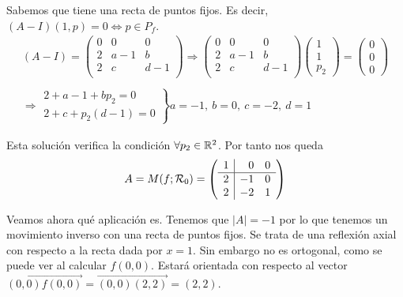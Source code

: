 \documentclass[12pt]{article}
\begin{document}
\begin{ejercicio}[3 puntos]
        Sabemos que tiene una recta de puntos fijos. Es decir, $(A-I)(1,p)=0 \Leftrightarrow p\in P_f$.
        \begin{gather*}
            (A-I)=\left(
                \begin{array}{c|cc}
                    0 & 0 & 0 \\
                    \hline
                    2 & a-1 & b \\
                    2 & c & d-1 \\
                \end{array}\right) \Rightarrow 
                \left(
                \begin{array}{c|cc}
                    0 & 0 & 0 \\
                    \hline
                    2 & a-1 & b \\
                    2 & c & d-1 \\
                \end{array}\right)
                \begin{pmatrix}
                    1\\1\\p_2
                \end{pmatrix} = 
                \begin{pmatrix}
                    0\\0\\0
                \end{pmatrix}\\\\
                \Rightarrow \left.
                \begin{array}{c}
                    2 + a -1 +bp_2 =0\\
                    2+c+p_2(d-1)=0
                \end{array} \right\} a=-1,\ b=0,\ c=-2,\ d= 1
        \end{gather*}

        Esta solución verifica la condición $\forall p_2 \in \mathbb{R}^2$. Por tanto nos queda
        \begin{gather*}
            A=M(f;\mathcal{R}_0)=\left(
            \begin{array}{r|rr}
                1 & 0 & 0 \\
                \hline
                2 & -1 & 0 \\
                2 & -2 & 1 \\
            \end{array}\right)
        \end{gather*}

        Veamos ahora qué aplicación es. Tenemos que $|A|=-1$ por lo que tenemos un movimiento inverso con una recta de puntos fijos. Se trata de una reflexión axial con respecto a la recta dada por $x=1$. Sin embargo no es ortogonal, como se puede ver al calcular $f(0,0)$. Estará orientada con respecto al vector $\vec{(0,0)f(0,0)}=\vec{(0,0)(2,2)}=(2,2)$. %
    \end{ejercicio}
\end{document}
